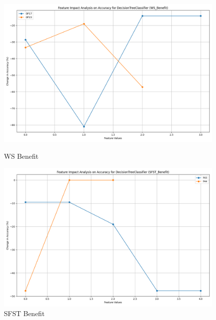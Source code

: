 \begin{figure}[H]
    \centering
    \begin{minipage}{0.495\textwidth}
        \centering
        \includegraphics[width=\linewidth]{analysis/images/feature_impact_accuracy_WS_Benefit_DecisionTreeClassifier.png}
        \caption{WS Benefit}
        \label{fig:ws_ben_accuracy_analysis}
    \end{minipage}\hfill
    \begin{minipage}{0.495\textwidth}
        \centering
        \includegraphics[width=\linewidth]{analysis/images/feature_impact_accuracy_SFST_Benefit_DecisionTreeClassifier.png}
        \caption{SFST Benefit}
        \label{fig:sfst_ben_accuracy_analysis}
    \end{minipage}
\end{figure}


